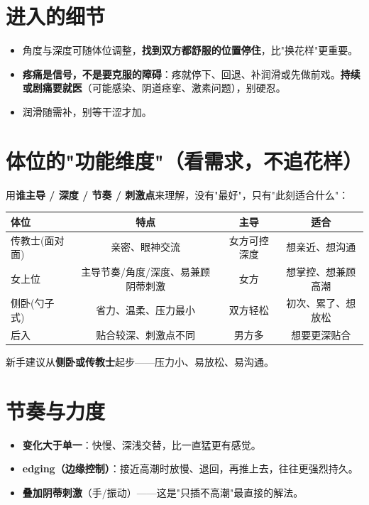 \documentclass[12pt,UTF8,openany]{ctexbook}
\begin{document}
\section{进入的细节}

\begin{itemize}[leftmargin=2em,itemsep=0.3em]
  \item 角度与深度可随体位调整，\textbf{找到双方都舒服的位置停住}，比"换花样"更重要。
  \item \textbf{疼痛是信号，不是要克服的障碍}：疼就停下、回退、补润滑或先做前戏。\textbf{持续或剧痛要就医}（可能感染、阴道痉挛、激素问题），别硬忍。
  \item 润滑随需补，别等干涩才加。
\end{itemize}

\section{体位的"功能维度"（看需求，不追花样）}

用\textbf{谁主导 / 深度 / 节奏 / 刺激点}来理解，没有"最好"，只有"此刻适合什么"：

\begin{tabularx}{\textwidth}{lCCC}
\toprule
体位 & 特点 & 主导 & 适合 \\
\midrule
传教士(面对面) & 亲密、眼神交流 & 女方可控深度 & 想亲近、想沟通 \\
女上位 & 主导节奏/角度/深度、易兼顾阴蒂刺激 & 女方 & 想掌控、想兼顾高潮 \\
侧卧(勺子式) & 省力、温柔、压力最小 & 双方轻松 & 初次、累了、想放松 \\
后入 & 贴合较深、刺激点不同 & 男方多 & 想要更深贴合 \\
\bottomrule
\end{tabularx}

\vspace{0.5em}
\noindent 新手建议从\textbf{侧卧或传教士}起步——压力小、易放松、易沟通。

\section{节奏与力度}

\begin{itemize}[leftmargin=2em,itemsep=0.3em]
  \item \textbf{变化大于单一}：快慢、深浅交替，比一直猛更有感觉。
  \item \textbf{edging（边缘控制）}：接近高潮时放慢、退回，再推上去，往往更强烈持久。
  \item \textbf{叠加阴蒂刺激}（手/振动）——这是"只插不高潮"最直接的解法。
\end{itemize}
\end{document}
